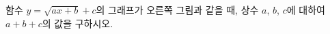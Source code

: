 \noindent\begin{minipage}[t]{0.58\linewidth}\vspace{0pt}\raggedright 함수 $y=\sqrt{ax+b}+c$의 그래프가 오른쪽 그림과 같을 때, 상수 $a$, $b$, $c$에 대하여 $a+b+c$의 값을 구하시오.\end{minipage}\hfill\begin{minipage}[t]{0.4\linewidth}\vspace{0pt}\centering \resizebox{\ifdim\width>\linewidth\linewidth\else\width\fi}{!}{}\end{minipage}\par
